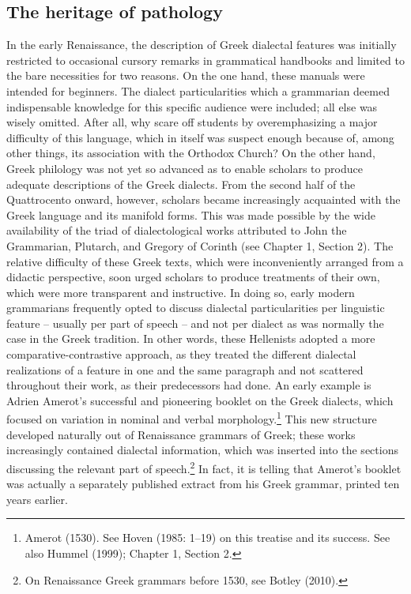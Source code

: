 \subsection{The heritage of pathology}
\hypertarget{Toc19704845}{}\begin{styleStandard}
In the early Renaissance, the description of Greek dialectal features was initially restricted to occasional cursory remarks in grammatical handbooks and limited to the bare necessities for two reasons. On the one hand, these manuals were intended for beginners. The dialect particularities which a grammarian deemed indispensable knowledge for this specific audience were included; all else was wisely omitted. After all, why scare off students by overemphasizing a major difficulty of this language, which in itself was suspect enough because of, among other things, its association with the Orthodox Church? On the other hand, Greek philology was not yet so advanced as to enable scholars to produce adequate descriptions of the Greek dialects. From the second half of the Quattrocento onward, however, scholars became increasingly acquainted with the Greek language and its manifold forms. This was made possible by the wide availability of the triad of dialectological works attributed to John the Grammarian, Plutarch, and Gregory of Corinth (see Chapter 1, Section 2). The relative difficulty of these Greek texts, which were inconveniently arranged from a didactic perspective, soon urged scholars to produce treatments of their own, which were more transparent and instructive. In doing so, early modern grammarians frequently opted to discuss dialectal particularities per linguistic feature – usually per part of speech – and not per dialect as was normally the case in the Greek tradition. In other words, these Hellenists adopted a more comparative-contrastive approach, as they treated the different dialectal realizations of a feature in one and the same paragraph and not scattered throughout their work, as their predecessors had done. An early example is Adrien Amerot’s successful and pioneering booklet on the Greek dialects, which focused on variation in nominal and verbal morphology.\footnote{\textrm{ Amerot (1530). See Hoven (1985: 1–19) on this treatise and its success. See also Hummel (1999); Chapter 1, Section 2.}} This new structure developed naturally out of Renaissance grammars of Greek; these works increasingly contained dialectal information, which was inserted into the sections discussing the relevant part of speech.\footnote{\textrm{ On Renaissance Greek grammars before 1530, see Botley (2010).}} In fact, it is telling that Amerot’s booklet was actually a separately published extract from his Greek grammar, printed ten years earlier.
\end{styleStandard}


